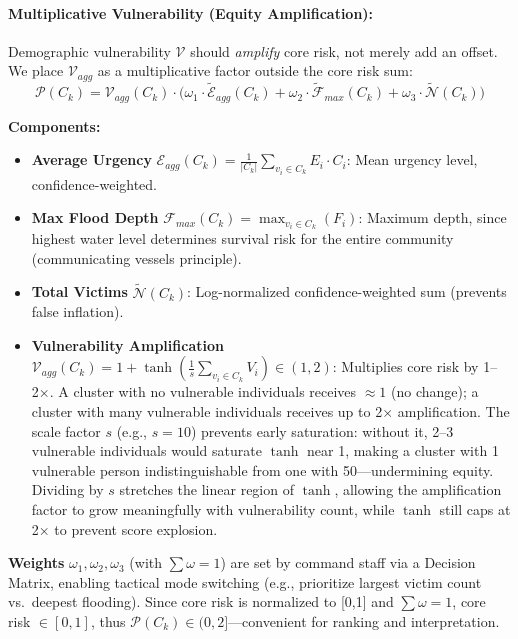 \documentclass[runningheads]{llncs}
\begin{document}
\paragraph{Multiplicative Vulnerability (Equity Amplification):}
Demographic vulnerability $\mathcal{V}$ should \textit{amplify} core risk, not merely add an offset. We place $\mathcal{V}_{agg}$ as a multiplicative factor outside the core risk sum:
\begin{equation}\label{eq:priority}
\mathcal{P}(C_k) = \mathcal{V}_{agg}(C_k) \cdot \Big( \omega_1 \cdot \widetilde{\mathcal{E}}_{agg}(C_k) + \omega_2 \cdot \widetilde{\mathcal{F}}_{max}(C_k) + \omega_3 \cdot \widetilde{\mathcal{N}}(C_k) \Big)
\end{equation}

\textbf{Components:}
\begin{itemize}
\item \textbf{Average Urgency} $\mathcal{E}_{agg}(C_k) = \frac{1}{|C_k|} \sum_{v_i \in C_k} E_i \cdot C_i$: Mean urgency level, confidence-weighted.
\item \textbf{Max Flood Depth} $\mathcal{F}_{max}(C_k) = \max_{v_i \in C_k}(F_i)$: Maximum depth, since highest water level determines survival risk for the entire community (communicating vessels principle).
\item \textbf{Total Victims} $\widetilde{\mathcal{N}}(C_k)$: Log-normalized confidence-weighted sum (prevents false inflation).
\item \textbf{Vulnerability Amplification} $\mathcal{V}_{agg}(C_k) = 1 + \tanh\!\left( \frac{1}{s} \sum_{v_i \in C_k} V_i \right) \in (1, 2)$: Multiplies core risk by 1--2×. A cluster with no vulnerable individuals receives $\approx 1$ (no change); a cluster with many vulnerable individuals receives up to 2× amplification. The scale factor $s$ (e.g., $s=10$) prevents early saturation: without it, 2--3 vulnerable individuals would saturate $\tanh$ near 1, making a cluster with 1 vulnerable person indistinguishable from one with 50---undermining equity. Dividing by $s$ stretches the linear region of $\tanh$, allowing the amplification factor to grow meaningfully with vulnerability count, while $\tanh$ still caps at 2× to prevent score explosion.
\end{itemize}

\textbf{Weights} $\omega_1, \omega_2, \omega_3$ (with $\sum \omega = 1$) are set by command staff via a Decision Matrix, enabling tactical mode switching (e.g., prioritize largest victim count vs.\ deepest flooding). Since core risk is normalized to [0,1] and $\sum \omega = 1$, core risk $\in [0,1]$, thus $\mathcal{P}(C_k) \in (0,2]$---convenient for ranking and interpretation.
\end{document}
